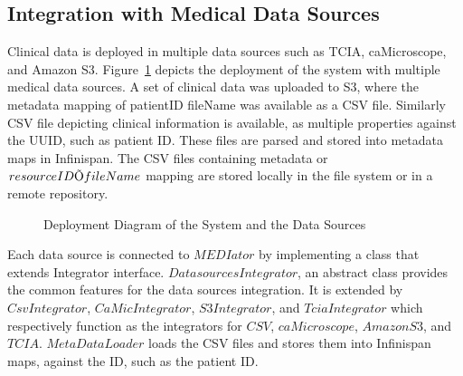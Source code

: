 \documentclass[letterpaper, 10 pt, conference]{ieeeconf}  %
\begin{document}
\subsection{Integration with Medical Data Sources}
Clinical data is deployed in multiple data sources such as TCIA, caMicroscope, and Amazon S3. Figure~\ref{fig:dsdeployment} depicts the deployment of the system with multiple medical data sources. A set of clinical data was uploaded to S3, where the metadata mapping of patientID  fileName was available as a CSV file. Similarly CSV file depicting clinical information is available, as multiple properties against the UUID, such as patient ID. These files are parsed and stored into metadata maps in Infinispan. The CSV files containing metadata or $resource ID \ding{213} fileName$ mapping are stored locally in the file system or in a remote repository.
\begin{figure}[!htbp]
	\begin{center}
	\end{center}
	\vspace{-13pt}
	\caption{Deployment Diagram of the System and the Data Sources}
	\vspace{-13pt}
	\label{fig:dsdeployment}
\end{figure}

Each data source is connected to $MEDIator$ by implementing a class that extends Integrator interface. $DatasourcesIntegrator$, an abstract class provides the common features for the data sources integration. It is extended by $CsvIntegrator$, $CaMicIntegrator$, $S3Integrator$, and $TciaIntegrator$ which respectively function as the integrators for $CSV$, $caMicroscope$, $Amazon S3$, and $TCIA$. $MetaDataLoader$ loads the CSV files and stores them into Infinispan maps, against the ID, such as the patient ID. 
\end{document}
